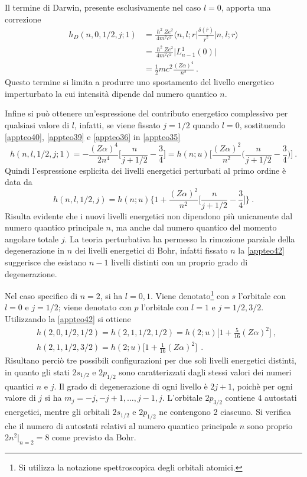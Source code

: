 \documentclass[12pt,a4paper]{report}
\numberwithin{equation}{section}
\numberwithin{section}{chapter}
\begin{document}
	Il termine di Darwin, presente esclusivamente nel caso $l=0$, apporta una correzione
	\begin{align}
	\label{appteo40}
	h_D(n,0,1/2,j;1) &= \frac{\hslash^2Ze^2}{4m^2c^2}\bigg\langle n,l;r\bigg|\frac{\delta(\widehat{r})}{\widehat{r}^2}\bigg|n,l;r\bigg\rangle\\
	&=\frac{\hslash^2Ze^2}{4m^2c^2}\big|L_{n-1}^1(0)\big|\nonumber\\
	&=\frac{1}{2}mc^2\frac{(Z\alpha)^4}{n^3}~.\nonumber
	\end{align}
	Questo termine si limita a produrre uno spostamento del livello energetico imperturbato la cui intensit\`a dipende dal numero quantico $n$.
	
	Infine si pu\`o ottenere un'espressione del contributo energetico complessivo per qualsiasi valore di $l$, infatti, se viene fissato $j=1/2$ quando $l=0$, sostituendo \eqref{appteo40}, \eqref{appteo39} e \eqref{appteo36} in \eqref{appteo35}
	\begin{equation}
	\label{appteo41}
	h(n,l,1/2,j;1) = -\frac{(Z\alpha)^4}{2n^4}\bigg[\frac{n}{j+1/2} - \frac{3}{4}\bigg] = h(n;u)\bigg[\frac{(Z\alpha)^2}{n^2}\bigg(\frac{n}{j+1/2} - \frac{3}{4}\bigg)\bigg]~.
	\end{equation}
	Quindi l'espressione esplicita dei livelli energetici perturbati al primo ordine \`e data da
	\begin{equation}
	\label{appteo42}
	h(n,l,1/2,j) = h(n;u)\bigg\lbrace 1 + \frac{(Z\alpha)^2}{n^2}\bigg[\frac{n}{j+1/2} - \frac{3}{4}\bigg] \bigg\rbrace~.
	\end{equation}
	Risulta evidente che i nuovi livelli energetici non dipendono pi\`u unicamente dal numero quantico principale $n$, ma anche dal numero quantico del momento angolare totale $j$. La teoria perturbativa ha permesso la rimozione parziale della degenerazione in $n$ dei livelli energetici di Bohr, infatti fissato $n$ la \eqref{appteo42} suggerisce che esistano $n-1$ livelli distinti con un proprio grado di degenerazione.
	
	
	
	Nel caso specifico di $n=2$, si ha $l=0,1$. Viene denotato\footnote{Si utilizza la notazione spettroscopica degli orbitali atomici.} con $s$ l'orbitale con $l=0$ e $j=1/2$; viene denotato con $p$ l'orbitale con $l=1$ e $j=1/2,3/2$. Utilizzando la \eqref{appteo42} si ottiene
	\begin{align}
	&h(2,0,1/2,1/2) = h(2,1,1/2,1/2) = h(2;u)\bigg[1+\frac{5}{16}(Z\alpha)^2\bigg]~,\label{appteo43}\\
	&h(2,1,1/2,3/2) = h(2;u)\bigg[1+\frac{1}{16}(Z\alpha)^2\bigg]~\label{appteo44}~.
	\end{align}
	Risultano perci\`o tre possibili configurazioni per due soli livelli energetici distinti, in quanto gli stati $2s_{1/2}$ e $2p_{1/2}$ sono caratterizzati dagli stessi valori dei numeri quantici $n$ e $j$. Il grado di degenerazione di ogni livello \`e $2j+1$, poich\`e per ogni valore di $j$ si ha $m_j=-j,-j+1,\dots,j-1,j$. L'orbitale $2p_{3/2}$ contiene 4 autostati energetici, mentre gli orbitali $2s_{1/2}$ e $2p_{1/2}$ ne contengono 2 ciascuno. Si verifica che il numero di autostati relativi al numero quantico principale $n$ sono proprio $2n^2|_{n=2}=8$ come previsto da Bohr.
	
\end{document}
